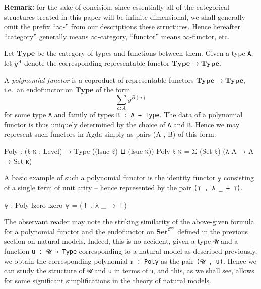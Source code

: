 \documentclass[
  11pt,
  oneside,
  article]{memoir}
\newenvironment{Shaded}{}{}
\newcommand{\DataTypeTok}[1]{\textcolor[rgb]{0.56,0.13,0.00}{#1}}
\newcommand{\NormalTok}[1]{#1}
\newcommand{\OtherTok}[1]{\textcolor[rgb]{0.00,0.44,0.13}{#1}}
\theoremstyle{definition}
\theoremstyle{plain}
\newcommand{\0}{\textsf{0}}
\newcommand{\1}{\tn{\textsf{1}}}
\begin{document}
\textbf{Remark:} for the sake of concision, since essentially all of the
categorical structures treated in this paper will be
infinite-dimensional, we shall generally omit the prefix ``\(\infty\)-''
from our descriptions these structures. Hence hereafter ``category''
generally means \(\infty\)-category, ``functor'' means
\(\infty\)-functor, etc.

Let \(\mathbf{Type}\) be the category of types and functions between
them. Given a type \texttt{A}, let \(y^A\) denote the corresponding
representable functor \(\mathbf{Type} \to \mathbf{Type}\).

A \emph{polynomial functor} is a coproduct of representable functors
\(\mathbf{Type} \to \mathbf{Type}\), i.e.~an endofunctor on
\(\mathbf{Type}\) of the form \[
\sum_{a : A} y^{B(a)}
\] for some type \texttt{A} and family of types
\texttt{B\ :\ A\ →\ Type}. The data of a polynomial functor is thus
uniquely determined by the choice of \texttt{A} and \texttt{B}. Hence we
may represent such functors in Agda simply as pairs (A , B) of this
form:

\begin{Shaded}
\begin{Highlighting}[]
\NormalTok{Poly }\OtherTok{:} \OtherTok{(}\NormalTok{ℓ κ }\OtherTok{:}\NormalTok{ Level}\OtherTok{)} \OtherTok{→}\NormalTok{ Type }\OtherTok{((}\NormalTok{lsuc ℓ}\OtherTok{)}\NormalTok{ ⊔ }\OtherTok{(}\NormalTok{lsuc κ}\OtherTok{))}
\NormalTok{Poly ℓ κ }\OtherTok{=}\NormalTok{ Σ }\OtherTok{(}\DataTypeTok{Set}\NormalTok{ ℓ}\OtherTok{)} \OtherTok{(λ}\NormalTok{ A }\OtherTok{→}\NormalTok{ A }\OtherTok{→} \DataTypeTok{Set}\NormalTok{ κ}\OtherTok{)}
\end{Highlighting}
\end{Shaded}

A basic example of such a polynomial functor is the identity functor
\texttt{𝕪} consisting of a single term of unit arity -- hence
represented by the pair \texttt{(⊤\ ,\ λ\ \_\ →\ ⊤)}.

\begin{Shaded}
\begin{Highlighting}[]
\NormalTok{𝕪 }\OtherTok{:}\NormalTok{ Poly lzero lzero}
\NormalTok{𝕪 }\OtherTok{=} \OtherTok{(}\NormalTok{⊤ , }\OtherTok{λ} \OtherTok{\_} \OtherTok{→}\NormalTok{ ⊤}\OtherTok{)}
\end{Highlighting}
\end{Shaded}

The observant reader may note the striking similarity of the above-given
formula for a polynomial functor and the endofunctor on
\(\mathbf{Set}^{\mathcal{C}^{op}}\) defined in the previous section on
natural models. Indeed, this is no accident, given a type \texttt{𝓤} and
a function \texttt{u\ :\ 𝓤\ →\ Type} corresponding to a natural model as
described previously, we obtain the corresponding polynomial
\texttt{𝔲\ :\ Poly} as the pair \texttt{(𝓤\ ,\ u)}. Hence we can study
the structure of \texttt{𝓤} and \texttt{u} in terms of \texttt{𝔲}, and
this, as we shall see, allows for some significant simplifications in
the theory of natural models.
\end{document}
